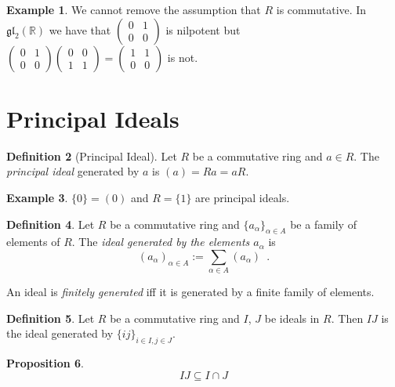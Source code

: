 \documentclass{book}
\newtheorem{prop}{Proposition}[chapter]
\theoremstyle{definition}
\newtheorem{df}[prop]{Definition}
\newtheorem{ex}[prop]{Example}
\newcommand{\gl}[2]{\ensuremath{\mathfrak{gl}_{#1} \left( {#2} \right)}}
\begin{document}
\begin{ex}
We cannot remove the assumption that $R$ is commutative. In $\gl{2}{\mathbb{R}}$ we have that $\left( \begin{array}{cc} 0 & 1 \\ 0 & 0 \end{array} \right)$ is nilpotent but $\left( \begin{array}{cc} 0 & 1 \\ 0 & 0 \end{array} \right) \left( \begin{array}{cc} 0 & 0 \\ 1 & 1 \end{array} \right) = \left( \begin{array}{cc} 1 & 1 \\ 0 & 0 \end{array} \right)$ is not.
\end{ex}

\section{Principal Ideals}

\begin{df}[Principal Ideal]
Let $R$ be a commutative ring and $a \in R$. The \emph{principal ideal} generated by $a$ is $(a) = Ra = aR$.
\end{df}

\begin{ex}
$\{0\} = (0)$ and $R = \{1\}$ are principal ideals.
\end{ex}

\begin{df}
Let $R$ be a commutative ring and $\{a_\alpha\}_{\alpha \in A}$ be a family of elements of $R$. The \emph{ideal generated by the elements $a_\alpha$} is
\[ (a_\alpha)_{\alpha \in A} := \sum_{\alpha \in A} (a_\alpha) \enspace . \]

An ideal is \emph{finitely generated} iff it is generated by a finite family of elements.
\end{df}

\begin{df}
Let $R$ be a commutative ring and $I$, $J$ be ideals in $R$. Then $IJ$ is the ideal generated by $\{ ij \}_{i \in I, j \in J}$.
\end{df}

\begin{prop}
\[ IJ \subseteq I \cap J \]
\end{prop}
\end{document}
